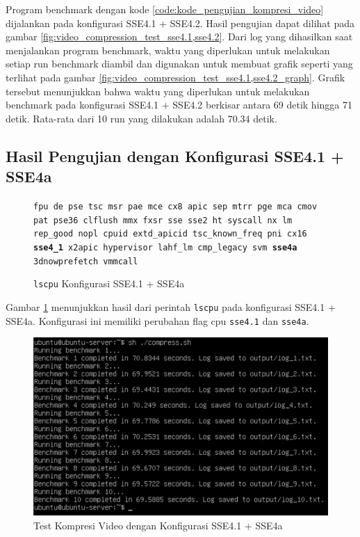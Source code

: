 Program benchmark dengan kode \ref{code:kode_pengujian_kompresi_video} dijalankan pada konfigurasi SSE4.1 + SSE4.2. Hasil pengujian dapat dilihat pada gambar \ref{fig:video_compression_test_sse4.1,sse4.2}. Dari log yang dihasilkan saat menjalankan program benchmark, waktu yang diperlukan untuk melakukan setiap run benchmark diambil dan digunakan untuk membuat grafik seperti yang terlihat pada gambar \ref{fig:video_compression_test_sse4.1,sse4.2_graph}. Grafik tersebut menunjukkan bahwa waktu yang diperlukan untuk melakukan benchmark pada konfigurasi SSE4.1 + SSE4.2 berkisar antara 69 detik hingga 71 detik. Rata-rata dari 10 run yang dilakukan adalah 70.34 detik.

\subsection{Hasil Pengujian dengan Konfigurasi SSE4.1 + SSE4a}
\begin{figure}
    \texttt{fpu de pse tsc msr pae mce cx8 apic sep mtrr pge mca cmov pat pse36 clflush mmx fxsr sse sse2 ht syscall nx lm rep\_good nopl cpuid extd\_apicid tsc\_known\_freq pni cx16 \textbf{sse4\_1} x2apic hypervisor lahf\_lm cmp\_legacy svm \textbf{sse4a} 3dnowprefetch vmmcall}
    \caption{\texttt{lscpu} Konfigurasi SSE4.1 + SSE4a}
    \label{fig:lscpu_video_compression_test_sse4.1,sse4a}
\end{figure}

Gambar \ref{fig:lscpu_video_compression_test_sse4.1,sse4a} menunjukkan hasil dari perintah \texttt{lscpu} pada konfigurasi SSE4.1 + SSE4a. Konfigurasi ini memiliki perubahan flag cpu \texttt{sse4.1} dan \texttt{sse4a}.

\begin{figure}
    \centering
    \includegraphics[width=1\textwidth]
    {assets/pics/video-compression-test/sse4.1,sse4a.jpeg}
    \caption{Test Kompresi Video dengan Konfigurasi SSE4.1 + SSE4a}
    \label{fig:video_compression_test_sse4.1,sse4a}
\end{figure}

